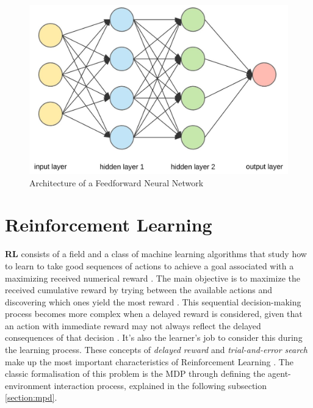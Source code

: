 \begin{figure}
	\centering
	\includegraphics[width=0.50\linewidth]{./figures/fnn.jpg}
	\caption{Architecture of a Feedforward Neural Network \cite{FeedforwardNeuralNetwork}}
	\label{fig:fnn}
\end{figure}


\section{Reinforcement Learning} \label{sec:rl}

\textbf{\ac{RL}} consists of a field and a class of machine learning algorithms that study how to learn to take good sequences of actions to achieve a goal associated with a maximizing received numerical reward \cite{brunskillCS234ReinforcementLearning}. The main objective is to maximize the received cumulative reward by trying between the available actions and discovering which ones yield the most reward \cite{suttonReinforcementLearningIntroduction2014}. This sequential decision-making process becomes more complex when a delayed reward is considered, given that an action with immediate reward may not always reflect the delayed consequences of that decision \cite{suttonReinforcementLearningIntroduction2014}. It's also the learner's job to consider this during the learning process. These concepts of \textit{delayed reward} and \textit{trial-and-error search} make up the most important characteristics of Reinforcement Learning \cite{suttonReinforcementLearningIntroduction2014}. The classic formalisation of this problem is the \ac{MDP} through defining the agent-environment interaction process, explained in the following subsection \ref{section:mpd}. \par 


